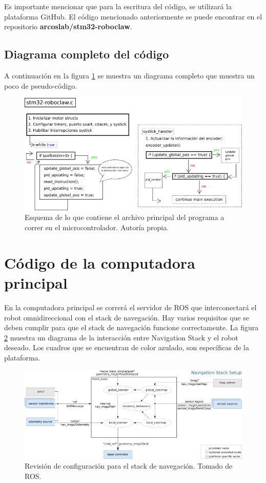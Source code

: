 Es importante mencionar que para la escritura del código, se utilizará la plataforma GitHub. El código mencionado anteriormente se puede encontrar en el repositorio \textbf{arcoslab/stm32-roboclaw}.

\subsection{Diagrama completo del código}
A continuación en la figura \ref{F:main} se muestra un diagrama completo que muestra un poco de pseudo-código.

\begin{figure}[H]
\centering
%
%
\includegraphics[scale=0.8]{imagenes/diagrama_main.png}
\caption{Esquema de lo que contiene el archivo principal del programa a correr en el microcontrolador. Autoría propia.}
\label{F:main}
\end{figure}

\newpage

\section{Código de la computadora principal}

En la computadora principal se correrá el servidor de ROS que interconectará el robot omnidireccional con el stack de navegación. Hay varios requisitos que se deben cumplir para que el stack de navegación funcione correctamente. La figura \ref{F:navigation_stack} muestra un diagrama de la interacción entre Navigation Stack y el robot deseado. Los cuadros que se encuentran de color azulado, son específicas de la plataforma.

\begin{figure}[H]
\centering
\includegraphics[scale=0.7]{imagenes/overview_tf_small.png}
\caption{Revisión de configuración para el stack de navegación. Tomado de ROS.}
\label{F:navigation_stack}
\end{figure}

